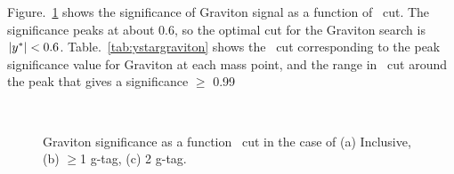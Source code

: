 Figure.~\ref{fig: graviton significance as a function of y* cut} shows the significance of Graviton signal as a function of \ystar\ cut. The significance peaks at about 0.6, so the optimal  cut for the Graviton search is $|y^\ast| < 0.6$. Table.~\ref{tab:ystargraviton} shows the \ystar\ cut corresponding to the peak significance value for Graviton at each mass point, and the range in \ystar\ cut around the peak that gives a significance $\geq$ 0.99
\begin{figure}[!htb]
        \centering
        \\
        \caption{Graviton significance as a function \ystar\ cut in the case of (a) Inclusive, (b) $\geq$1 g-tag, (c) 2 g-tag.}
        \label{fig: graviton significance as a function of y* cut}
\end{figure}



